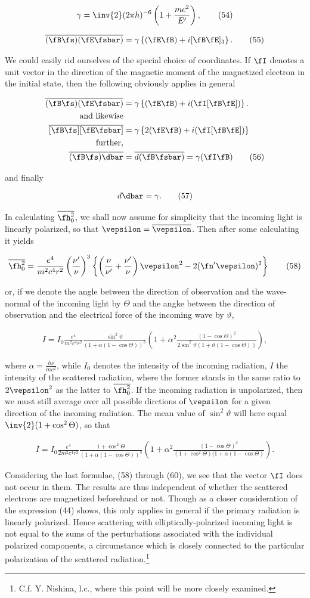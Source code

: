 \documentclass{article}
\newcommand{\nequ}[2]{
\begin{align*}
#1
\tag{#2}
\end{align*}
}
\begin{document}
\nequ{
\gamma = \inv{2}(2\pi h)^{-6}\left(1+\frac{mc^2}{E'}\right),
}{54}
\nequ{
\overline{(\fB\fs)}\overline{(\fE\fsbar)} = \gamma\left\{(\fE\fB) + i[\fB\fE]_3 \right\}.
}{55}
We could easily rid ourselves of the special choice of coordinates. If $\fI$ denotes a unit vector in the direction of the magnetic moment of the magnetized electron in the initial state, then the following obviously applies in general
\nequ{
\overline{(\fB\fs)(\fE\fsbar)} &= \gamma\left\{(\fE\fB) + i(\fI[\fB\fE]) \right\}.\\
\text{and likewise}\\
\overline{[\fB\fs][\fE\fsbar]} &= \gamma\left\{2(\fE\fB) + i(\fI[\fB\fE]) \right\}\\
\text{further},\\
\overline{(\fB\fs)\dbar} &= \overline{d(\fB\fsbar)} = \gamma(\fI\fB)
}{56}
and finally
\nequ{
d\dbar = \gamma.
}{57}

In calculating $\overline{\fh_0^2}$, we shall now assume for simplicity that the incoming light is linearly polarized, so that $\vepsilon = \overline{\vepsilon}$. Then after some calculating it yields
\nequ{
\overline{\fh_0^2} = \frac{e^4}{m^2c^4r^2} \left(\frac{\nu'}{\nu}\right)^3
\left\{\left(\frac{\nu}{\nu'} + \frac{\nu'}{\nu}\right)\vepsilon^2 - 2(\fn'\vepsilon)^2\right\}
}{58}
or, if we denote the angle between the direction of observation and the wave-normal of the incoming light by $\Theta$ and the angke between the direction of observation and the electrical force of the incoming wave by $\vartheta$,
\nequ{
I = I_0\frac{e^4}{m^2c^4r^2}\frac{\sin^2\vartheta}{\left(1+\alpha(1-\cos\Theta)\right)^3}
\left(1+\alpha^2\frac{(1-\cos\Theta)^2}{2\sin^2\vartheta(1+\vartheta(1-\cos\Theta))}\right),
}{59}
where $\alpha = \frac{h\nu}{mc^2}$, while $I_0$ denotes the intensity of the incoming radiation, $I$ the intensity of the scattered radiation, where the former stands in the same ratio to $2\vepsilon^2$ as the latter to $\overline{\fh_0^2}$. If the incoming radiation is unpolarized, then we must still average over all possible dirctions of $\vepsilon$ for a given direction of the incoming radiation. The mean value of $\sin^2\vartheta$ will here equal $\inv{2}(1+\cos^2\Theta)$, so that
\nequ{
\overline{I} = I_0\frac{e^4}{2m^2c^4r^2}\frac{1+\cos^2\Theta}{\left(1+\alpha(1-\cos\Theta)\right)^3}
\left(1+\alpha^2\frac{(1-\cos\Theta)^2}{(1+\cos^2\Theta)(1+\alpha(1-\cos\Theta)}\right).
}{60}

Considering the last formulae, (58) through (60), we see that the vector $\fI$ does not occur in them. The results are thus independent of whether the scattered electrons are magnetized beforehand or not. Though as a closer consideration of the expression (44) shows, this only applies in general if the primary radiation is linearly polarized. Hence scattering with elliptically-polarized incoming light is not equal to the sums of the perturbations associated with the individual polarized components, a circumstance which is closely connected to the particular polarization of the scattered radiation.\footnote{C.f. Y. Nishina, l.c., where this point will be more closely examined.}
\end{document}
